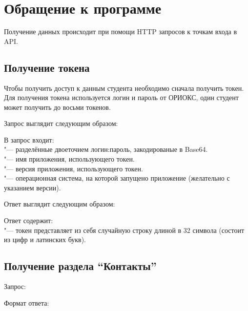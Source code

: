 \chapter{Обращение к программе}
\label{ch:usage}

Получение данных происходит при помощи HTTP запросов к точкам входа в API\@.

\section{Получение токена}
\label{sec:token}
Чтобы получить доступ к данным студента необходимо сначала получить токен.
Для получения токена используется логин и пароль от ОРИОКС, один студент может получить до восьми токенов.

Запрос выглядит следующим образом:
\begin{listing}[H]
\end{listing}
\vspace{-0.75cm}

В запрос входит:\\
 "--- разделённые двоеточием логин:пароль, закодированые в Base64.\\
 "--- имя приложения, использующего токен.\\
 "--- версия приложения, использующего токен.\\
 "--- операционная система, на которой запущено приложение (желательно с указанием версии).

Ответ выглядит следующим образом:
\begin{listing}[H]
\end{listing}
\vspace{-0.75cm}

Ответ содержит:\\
 "--- токен представляет из себя случайную строку длиной в 32 символа (состоит из цифр и латинских букв).

\section{Получение раздела ``Контакты''}
\label{sec:contacts}

Запрос: 

Формат ответа:
\begin{listing}[H]
\end{listing}
\vspace{-0.75cm}

